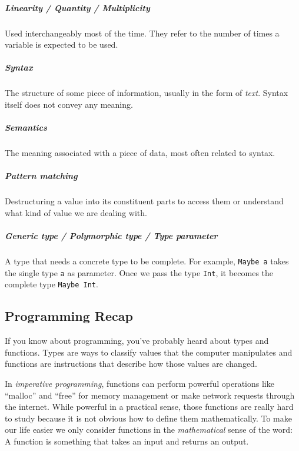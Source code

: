 \documentclass[
]{article}
\begin{document}
\hypertarget{linearity-quantity-multiplicity}{%
\subparagraph{Linearity / Quantity /
Multiplicity}\label{linearity-quantity-multiplicity}}

Used interchangeably most of the time. They refer to the number of times
a variable is expected to be used.

\hypertarget{syntax}{%
\subparagraph{Syntax}\label{syntax}}

The structure of some piece of information, usually in the form of
\emph{text}. Syntax itself does not convey any meaning.

\hypertarget{semantics}{%
\subparagraph{Semantics}\label{semantics}}

The meaning associated with a piece of data, most often related to
syntax.

\hypertarget{pattern-matching}{%
\subparagraph{Pattern matching}\label{pattern-matching}}

Destructuring a value into its constituent parts to access them or
understand what kind of value we are dealing with.

\hypertarget{generic-type-polymorphic-type-type-parameter}{%
\subparagraph{Generic type / Polymorphic type / Type
parameter}\label{generic-type-polymorphic-type-type-parameter}}

A type that needs a concrete type to be complete. For example,
\texttt{Maybe\ a} takes the single type \texttt{a} as parameter. Once we
pass the type \texttt{Int}, it becomes the complete type
\texttt{Maybe\ Int}.

\hypertarget{programming-recap}{%
\subsection{Programming Recap}\label{programming-recap}}

If you know about programming, you've probably heard about types and
functions. Types are ways to classify values that the computer
manipulates and functions are instructions that describe how those
values are changed.

In \emph{imperative programming}, functions can perform powerful
operations like ``malloc'' and ``free'' for memory management or make
network requests through the internet. While powerful in a practical
sense, those functions are really hard to study because it is not
obvious how to define them mathematically. To make our life easier we
only consider functions in the \emph{mathematical} sense of the word: A
function is something that takes an input and returns an output.
\end{document}
